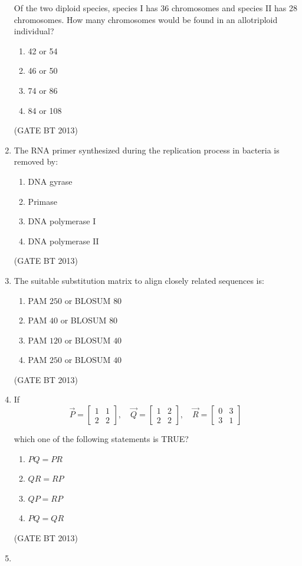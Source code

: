 \documentclass[journal,12pt,onecolumn]{IEEEtran}
\theoremstyle{remark}
\begin{document}
\begin{enumerate}
Of the two diploid species, species I has 36 chromosomes and species II has 28 chromosomes. How many chromosomes would be found in an allotriploid individual?

\begin{enumerate}
    \item 42 or 54
    \item 46 or 50
    \item 74 or 86
    \item 84 or 108
\end{enumerate} 
\hfill (GATE BT 2013)
\item 

The RNA primer synthesized during the replication process in bacteria is removed by:

\begin{enumerate}
    \item DNA gyrase
    \item Primase
    \item DNA polymerase I
    \item DNA polymerase II
\end{enumerate} 
\hfill (GATE BT 2013)
\item 

The suitable substitution matrix to align closely related sequences is:

\begin{enumerate}
    \item PAM $250$ or BLOSUM $80$
    \item PAM $40$ or BLOSUM $80$
    \item PAM $120$ or BLOSUM $40$
    \item PAM $250$ or BLOSUM $40$
\end{enumerate} 
\hfill (GATE BT 2013)
\item 

If 
\[
\vec{P} = \begin{bmatrix}
1 & 1 \\
2 & 2
\end{bmatrix},
\quad
\vec{Q} = \begin{bmatrix}
1 & 2 \\
2 & 2
\end{bmatrix},
\quad
\vec{R} = \begin{bmatrix}
0 & 3 \\
3 & 1
\end{bmatrix}
\]

which one of the following statements is TRUE?

\begin{enumerate}
    \item $PQ = PR$
    \item $QR = RP$
    \item $QP = RP$
    \item $PQ = QR$
\end{enumerate}
\hfill (GATE BT 2013)
\item 


\end{enumerate}
\end{document}
